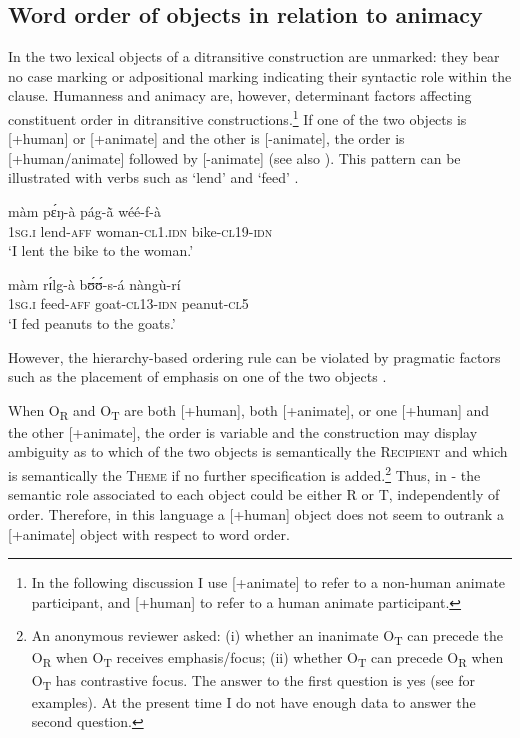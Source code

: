 \documentclass[output=paper]{langsci/langscibook}
\begin{document}
\subsection{Word order of objects in relation to animacy}\label{§4.2:word.pacchiarotti}

In  the two lexical objects of a ditransitive construction are unmarked: they bear no case marking or adpositional marking indicating their syntactic role within the clause. Humanness and animacy are, however, determinant factors affecting constituent order in ditransitive constructions.\footnote{In the following discussion I use [+animate] to refer to a non-human animate participant, and [+human] to refer to a human animate participant.} If one of the two objects is [+human] or [+animate] and the other is [-animate], the order is [+human/animate] followed by [-animate] (see also \citealt[394]{canu1974}). This pattern can be illustrated with verbs such as `lend'  and `feed' .

\ea
\label{ex:14.pacchiarotti}
\gll màm    pɛ́ŋ-à         pág-\`{ã}      wéé-f-à\\
\textsc{1sg.i}    lend-\textsc{aff}        woman-\textsc{cl1.idn}  bike-\textsc{cl19-idn}\\
\glt `I lent the bike to the woman.'
\z

\ea
\label{ex:15.pacchiarotti}
\gll màm    rɪ́lg-à      bʊ́ʊ́-s-á    nàngù-rí \\
\textsc{1sg.i}    feed-\textsc{aff}    goat-\textsc{cl13-idn}  peanut-\textsc{cl5}\\
\glt `I fed peanuts to the goats.'
\z

However, the hierarchy-based ordering rule can be violated by pragmatic factors such as the placement of emphasis on one of the two objects \citep[375]{kabore1985}.

When O\textsubscript{R} and O\textsubscript{T} are both [+human], both [+animate], or one [+human] and the other [+animate],  the order is variable and the construction may display ambiguity as to which of the two objects is semantically the \textsc{Recipient} and which is semantically the \textsc{Theme} if no further specification is added.\footnote{An anonymous reviewer asked: (i) whether an inanimate O\textsubscript{T} can precede the O\textsubscript{R} when O\textsubscript{T} receives emphasis/focus; (ii) whether O\textsubscript{T} can precede O\textsubscript{R} when O\textsubscript{T} has contrastive focus. The answer to the first question is yes (see \citealt[375]{kabore1985} for examples). At the present time I do not have enough data to answer the second question.} Thus, in - the semantic role associated to each object could be either R or T, independently of order. Therefore, in this language a [+human] object does not seem to outrank a [+animate] object with respect to word order.
\end{document}
